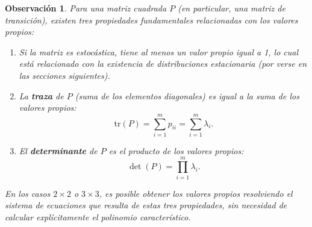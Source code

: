 \documentclass[12pt]{book}
\newtheorem{remark}{Observación}[chapter]
\begin{document}
\begin{remark}
Para una matriz cuadrada $P$ (en particular, una matriz de transición), existen tres propiedades fundamentales relacionadas con los valores propios:

\begin{enumerate}
    \item Si la matriz es estocástica, tiene al menos un valor propio igual a 1, lo cual está relacionado con la existencia de distribuciones estacionaria (por verse en las secciones siguientes). 

    \item La \textbf{traza} de $P$ (suma de los elementos diagonales) es igual a la suma de los valores propios:
    \[
    \text{tr}(P) = \sum_{i=1}^m p_{ii} = \sum_{i=1}^m \lambda_i.
    \]
    
    \item El \textbf{determinante} de $P$ es el producto de los valores propios:
    \[
    \det(P) = \prod_{i=1}^m \lambda_i.
    \]
\end{enumerate}
En los casos $2 \times 2$ o $3 \times 3$, es posible obtener los valores propios resolviendo el sistema de ecuaciones que resulta de estas tres propiedades, sin necesidad de calcular explícitamente el polinomio característico.
\end{remark}
\end{document}

